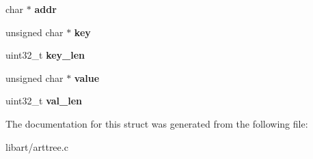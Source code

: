 \begin{DoxyCompactItemize}
char $\ast$ {\bfseries addr}
\item 
\mbox{\label{structds__context_af14f4e7f3e6ae0275d364664e0eb74a6}} 
unsigned char $\ast$ {\bfseries key}
\item 
\mbox{\label{structds__context_af60f306c9195616aaa574e0302603eab}} 
uint32\+\_\+t {\bfseries key\+\_\+len}
\item 
\mbox{\label{structds__context_a40c875f0541182e528d26d5bbc8ec5f2}} 
unsigned char $\ast$ {\bfseries value}
\item 
\mbox{\label{structds__context_abb6d28824cc5c5bd3effecdc8a902489}} 
uint32\+\_\+t {\bfseries val\+\_\+len}
\end{DoxyCompactItemize}


The documentation for this struct was generated from the following file\+:\begin{DoxyCompactItemize}
\item 
libart/arttree.\+c\end{DoxyCompactItemize}
